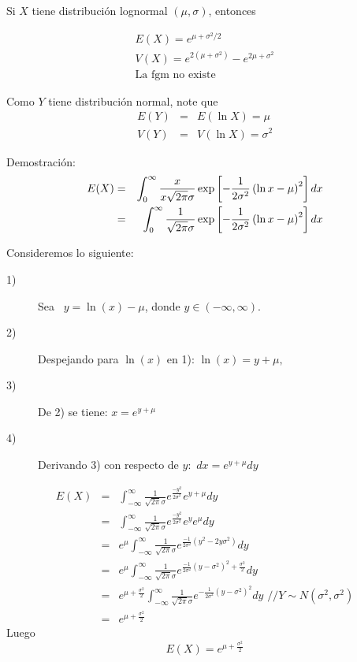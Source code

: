\begin{i}
\begin{theorem}
Si $X$ tiene distribución lognormal $(\mu ,\sigma )$,
entonces

\begin{equation*}
\begin{array}{l}
E(X)=e^{\mu +\sigma ^{2}/2} \\ 
V(X)=e^{2(\mu +\sigma ^{2})}-e^{2\mu +\sigma ^{2}} \\ 
\text{La fgm no existe}
\end{array}
\end{equation*}
\end{theorem}

Como $Y$ tiene distribución normal, note que
\begin{eqnarray*}
E(Y) &=&E(\ln X)=\mu \\
V(Y) &=&V(\ln X)=\sigma ^{2}
\end{eqnarray*}


Demostración:
\begin{eqnarray*}
E(X) &=&\int_{0}^{\infty }\frac{x}{x\sqrt{2\pi }\sigma }\exp \left[ -\frac{1%
}{2\sigma ^{2}}\left( \ln x-\mu \right) ^{2}\right] dx \\
&=&\int_{0}^{\infty }\frac{1}{\sqrt{2\pi }\sigma }\exp \left[ -\frac{1}{%
2\sigma ^{2}}\left( \ln x-\mu \right) ^{2}\right] dx
\end{eqnarray*}

Consideremos lo siguiente:
\begin{description}
\item[1)] Sea \ $y=\ln (x)-\mu $, donde $y\in (-\infty ,\infty ).$
\item[2)] Despejando para $\ln (x)$ en 1): $\ln (x)=y+\mu ,$
\item[3)] De 2) se tiene: $x=e^{y+\mu }$
\item[4)] Derivando 3) con respecto de $y:$ $dx=e^{y+\mu }dy$
\end{description}


\begin{eqnarray*}
E(X) &=&\int_{-\infty }^{\infty }\frac{1}{\sqrt{2\pi }\sigma }e^{\frac{-y^{2}
}{2\sigma ^{2}}}e^{y+\mu }dy \\
&=&\int_{-\infty }^{\infty }\frac{1}{\sqrt{2\pi }\sigma }e^{\frac{-y^{2}}{
2\sigma ^{2}}}e^{y}e^{\mu }dy \\
&=&e^{\mu }\int_{-\infty }^{\infty }\frac{1}{\sqrt{2\pi }\sigma }e^{\frac{-1
}{2\sigma ^{2}}(y^{2}-2y\sigma ^{2})}dy \\
&=&e^{\mu }\int_{-\infty }^{\infty }\frac{1}{\sqrt{2\pi }\sigma }e^{\frac{-1
}{2\sigma ^{2}}(y-\sigma ^{2})^{2}+\frac{\sigma ^{2}}{2}}dy \\
&=&e^{\mu +\frac{\sigma ^{2}}{2}}\int_{-\infty }^{\infty }\frac{1}{\sqrt{
2\pi }\sigma }e^{-\frac{1}{2\sigma ^{2}}(y-\sigma ^{2})^{2}}dy\text{ //}
Y\sim N(\sigma ^{2},\sigma ^{2}) \\
&=&e^{\mu +\frac{\sigma ^{2}}{2}}
\end{eqnarray*}
Luego
\begin{equation*}
E(X)=e^{\mu +\frac{\sigma ^{2}}{2}}
\end{equation*}


\end{i}
